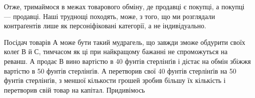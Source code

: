 Отже, тримаймося в межах товарового обміну, де продавці
є покупці, а покупці — продавці. Наші труднощі походять,
може, з того, що ми розглядали контраґентів лише як персоніфіковані
категорії, а не індивідуально.

Посідач товарів А може бути такий мудрагель, що завжди
зможе обдурити своїх колеґ В й С, тимчасом як ці при найкращому
бажанні не спроможуться на реванш. А продає В вино вартістю
в 40 фунтів стерлінґів і дістає на обмін збіжжя вартістю в
50 фунтів стерлінґів. А перетворив свої 40 фунтів стерлінґів
на 50 фунтів стерлінґів, з меншої кількости грошей зробив більшу
їх кількість і перетворив свій товар на капітал. Придивімось
\parbreak{}  %
